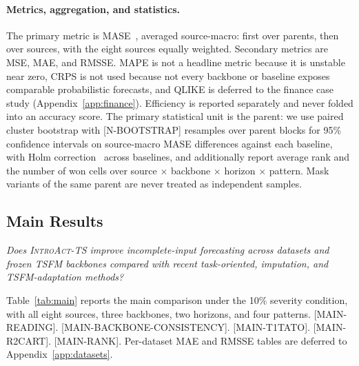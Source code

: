 \documentclass{article}
\newcommand{\ph}[1]{\textcolor{phgray}{\textsf{[#1]}}}
\newcommand{\introact}{\textsc{IntroAct-TS}}
\newcommand{\tsfm}{TSFM}
\begin{document}
\paragraph{Metrics, aggregation, and statistics.}
The primary metric is MASE~\citep{hyndman2006mase}, averaged source-macro: first over
parents, then over sources, with the eight sources equally weighted. Secondary metrics are
MSE, MAE, and RMSSE. MAPE is not a headline metric because it is unstable near zero, CRPS
is not used because not every backbone or baseline exposes comparable probabilistic
forecasts, and QLIKE is deferred to the finance case study (Appendix~\ref{app:finance}).
Efficiency is reported separately and never folded into an accuracy score. The primary
statistical unit is the parent: we use paired cluster bootstrap with \ph{N-BOOTSTRAP}
resamples over parent blocks for 95\% confidence intervals on source-macro MASE
differences against each baseline, with Holm correction~\citep{holm1979simple} across
baselines, and additionally report average rank and the number of won cells over
source $\times$ backbone $\times$ horizon $\times$ pattern. Mask variants of the same
parent are never treated as independent samples.

\subsection{Main Results}
\label{sec:exp-main}
\emph{Does \introact{} improve incomplete-input forecasting across datasets and frozen
\tsfm{} backbones compared with recent task-oriented, imputation, and TSFM-adaptation
methods?}

Table~\ref{tab:main} reports the main comparison under the 10\% severity condition, with
all eight sources, three backbones, two horizons, and four patterns. \ph{MAIN-READING}.
\ph{MAIN-BACKBONE-CONSISTENCY}. \ph{MAIN-T1TATO}. \ph{MAIN-R2CART}. \ph{MAIN-RANK}.
Per-dataset MAE and RMSSE tables are deferred to Appendix~\ref{app:datasets}.
\end{document}
